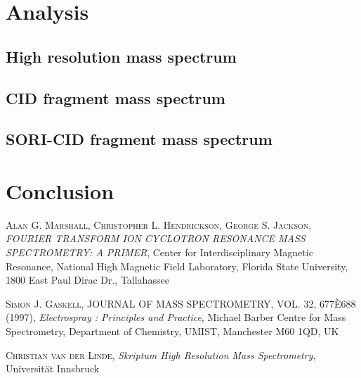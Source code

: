 \documentclass[a4paper,10pt]{article}
\begin{document}

\section{Analysis}

\subsection{High resolution mass spectrum}

\subsection{CID fragment mass spectrum}

\subsection{SORI-CID fragment mass spectrum}


\section{Conclusion}


\begin{thebibliography}{99}
\textsc{Alan G. Marshall, Christopher L. Hendrickson, George S. Jackson}, \textit{FOURIER TRANSFORM ION CYCLOTRON RESONANCE MASS SPECTROMETRY: A PRIMER}, Center for Interdisciplinary Magnetic Resonance, National High Magnetic Field Laboratory, Florida State University, 1800 East Paul Dirac Dr., Tallahassee

\textsc{Simon J. Gaskell}, JOURNAL OF MASS SPECTROMETRY, VOL. 32, 677È688 (1997), \textit{Electrospray : Principles and Practice}, Michael Barber Centre for Mass Spectrometry, Department of Chemistry, UMIST, Manchester M60 1QD, UK

\textsc{Christian van der Linde}, \textit{Skriptum High Resolution Mass Spectrometry}, Universität Innsbruck
\end{thebibliography}
\end{document}
